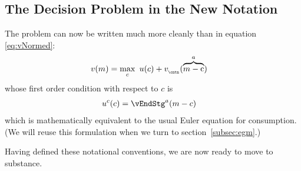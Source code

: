 \documentclass[titlepage, headings=optiontotocandhead]{Resources/texmf-local/tex/latex/econtex}
\begin{document}
\subsection{The Decision Problem in the New Notation}\label{subsec:decision-problem}

The {\Decision} problem can now be written much more cleanly than in equation \eqref{eq:vNormed}:
  \begin{equation}\begin{gathered}\begin{aligned}
        v(m) & = \max_{c}~ u(c) + v_{_\cntn}(\overbrace{m-\cFunc}^{a}) \label{eq:vMid}
      \end{aligned}\end{gathered}\end{equation}
whose first order condition with respect to $c$ is
\begin{equation}\begin{gathered}\begin{aligned}
  u^{c}(c) &= \vEndStg^{a}(m-c)  \label{eq:upEqbetaOp} 
\end{aligned}\end{gathered}\end{equation}
which is mathematically equivalent to the usual Euler equation for consumption.  (We will reuse this formulation when we turn to section~\ref{subsec:egm}.)

Having defined these notational conventions, we are now ready to move to substance.
\end{document}
